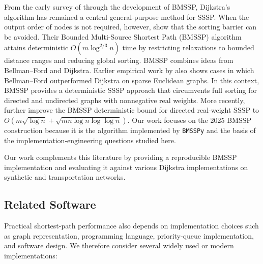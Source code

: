 \documentclass[ijoc,blindrev]{informs3} %
\begin{document}
From the early survey of \cite{dreyfus1969appraisal} through the development of BMSSP, Dijkstra’s algorithm has remained a central general-purpose method for SSSP. When the output order of nodes is not required, however, \cite{duan_breaking_2025} show that the sorting barrier can be avoided. Their Bounded Multi-Source Shortest Path (BMSSP) algorithm attains deterministic \(O(m\log^{2/3} n)\) time by restricting relaxations to bounded distance ranges and reducing global sorting. BMSSP combines ideas from Bellman--Ford \citep{bellman1958routing,ford1956network} and Dijkstra. Earlier empirical work by \cite{golden1976shortest} also shows cases in which Bellman--Ford outperformed Dijkstra on sparse Euclidean graphs. In this context, BMSSP provides a deterministic SSSP approach that circumvents full sorting for directed and undirected graphs with nonnegative real weights. More recently, \citet{duan2026faster} further improve the BMSSP deterministic bound for directed real-weight SSSP to $O(m\sqrt{\log n}+\sqrt{mn\log n\log\log n})$. Our work focuses on the 2025 BMSSP construction because it is the algorithm implemented by \texttt{BMSSPy} and the basis of the implementation-engineering questions studied here.

{\color{blue}
Our work complements this literature by providing a reproducible BMSSP implementation and evaluating it against {\color{blue}various} Dijkstra implementations on synthetic and transportation networks.
}

\subsection{Related Software}\label{subsec:relproj}

{\color{blue}
Practical shortest-path performance also depends on implementation choices such as graph representation, programming language, priority-queue implementation, and software design. We therefore consider several widely used or {\color{blue}modern} implementations:
}
\end{document}
